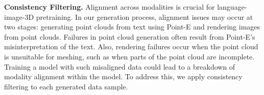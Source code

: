 



\noindent\textbf{Consistency Filtering.}
Alignment across modalities is crucial for language-image-3D pretraining. 
In our generation process, alignment issues may occur at two stages: generating point clouds from text using Point-E and rendering images from point clouds. Failures in point cloud generation often result from Point-E's misinterpretation of the text. Also, rendering failures occur when the point cloud is unsuitable for meshing, such as when parts of the point cloud are incomplete. 
Training a model with such misaligned data could lead to a breakdown of modality alignment within the model. To address this, we apply consistency filtering to each generated data sample.

